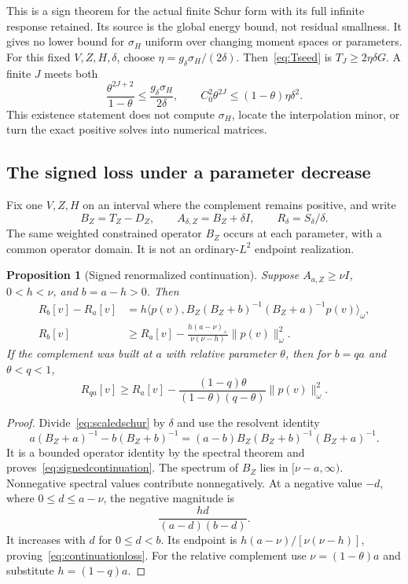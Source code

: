 \documentclass[11pt,a4paper]{article}
\numberwithin{equation}{section}
\newtheorem{proposition}[theorem]{Proposition}
\theoremstyle{remark}
\newcommand{\ip}[2]{\langle #1,#2\rangle}
\newcommand{\norm}[1]{\lVert #1\rVert}
\begin{document}
This is a sign theorem for the actual finite Schur form with its full infinite response retained. Its source is the global energy bound, not residual smallness. It gives no lower bound for $\sigma_H$ uniform over changing moment spaces or parameters.
For this fixed $V,Z,H,\delta$, choose
$\eta=g_\delta\sigma_H/(2\delta)$. Then~\eqref{eq:Tseed} is
$T_J\ge2\eta\delta G$. A finite $J$ meets both
\begin{equation}\label{eq:seedbudgets}
 \frac{\theta^{2J+2}}{1-\theta}\le\frac{g_\delta\sigma_H}{2\delta},
 \qquad C_0^2\theta^{2J}\le(1-\theta)\eta\delta^2.
\end{equation}
This existence statement does not compute $\sigma_H$, locate the interpolation minor, or turn the exact positive solves into numerical matrices.

\subsection{The signed loss under a parameter decrease}

Fix one $V,Z,H$ on an interval where the complement remains positive, and write
\begin{equation}\label{eq:renormalized}
 B_Z=T_Z-D_Z,\qquad A_{\delta,Z}=B_Z+\delta I,
 \qquad R_\delta=S_\delta/\delta.
\end{equation}
The same weighted constrained operator $B_Z$ occurs at each parameter, with a common operator domain. It is not an ordinary-$L^2$ endpoint realization.

\begin{proposition}[Signed renormalized continuation]\label{prop:continuation}
Suppose $A_{a,Z}\ge\nu I$, $0<h<\nu$, and $b=a-h>0$. Then
\begin{align}
 R_b[v]-R_a[v]
 &=h\ip{p(v)}{B_Z(B_Z+b)^{-1}(B_Z+a)^{-1}p(v)}_\omega,
                  \label{eq:signedcontinuation}\\
 R_b[v]&\ge R_a[v]
 -\frac{h(a-\nu)_+}{\nu(\nu-h)}\norm{p(v)}_\omega^2.
                  \label{eq:continuationloss}
\end{align}
If the complement was built at $a$ with relative parameter $\theta$, then for $b=qa$ and $\theta<q<1$,
\begin{equation}\label{eq:ratio_loss}
 R_{qa}[v]\ge R_a[v]
 -\frac{(1-q)\theta}{(1-\theta)(q-\theta)}\norm{p(v)}_\omega^2.
\end{equation}
\end{proposition}
\begin{proof}
Divide~\eqref{eq:scaledschur} by $\delta$ and use the resolvent identity
\[
 a(B_Z+a)^{-1}-b(B_Z+b)^{-1}
 =(a-b)B_Z(B_Z+b)^{-1}(B_Z+a)^{-1}.
\]
It is a bounded operator identity by the spectral theorem and proves~\eqref{eq:signedcontinuation}. The spectrum of $B_Z$ lies in $[\nu-a,\infty)$. Nonnegative spectral values contribute nonnegatively. At a negative value $-d$, where $0\le d\le a-\nu$, the negative magnitude is
\[
 \frac{hd}{(a-d)(b-d)}.
\]
It increases with $d$ for $0\le d<b$. Its endpoint is
$h(a-\nu)/[\nu(\nu-h)]$, proving~\eqref{eq:continuationloss}. For the relative complement use $\nu=(1-\theta)a$ and substitute $h=(1-q)a$.
\end{proof}
\end{document}
